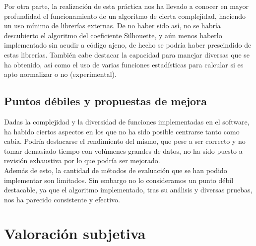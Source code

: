 \documentclass[10pt,a4paper]{article}
\begin{document}
Por otra parte, la realización de esta práctica nos ha llevado a conocer en
mayor profundidad el funcionamiento de un algoritmo de cierta complejidad,
haciendo un uso mínimo de librerías externas. De no haber sido así, no se habría
descubierto el algoritmo del coeficiente Silhouette, y aún menos haberlo
implementado sin acudir a código ajeno, de hecho se podría haber prescindido de estas librerías. 
También cabe destacar la capacidad para
manejar diversas que se ha obtenido, así como el uso de varias funciones
estadísticas para calcular si es apto normalizar o no (experimental).

\subsection{Puntos débiles y propuestas de mejora}

Dadas la complejidad y la diversidad de funciones implementadas en el software,
ha habido ciertos aspectos en los que no ha sido posible centrarse tanto como
cabía. Podría destacarse el rendimiento del mismo, que pese a ser correcto y no
tomar demasiado tiempo con volúmenes grandes de datos, no ha sido puesto a
revisión exhaustiva por lo que podría ser mejorado.\\

Además de esto, la cantidad de métodos de evaluación que se han podido
implementar son limitados. Sin embargo no lo consideramos un punto débil
destacable, ya que el algoritmo implementado, tras su análisis y diversas
pruebas, nos ha parecido consistente y efectivo.\\

\section{Valoración subjetiva}
\end{document}
